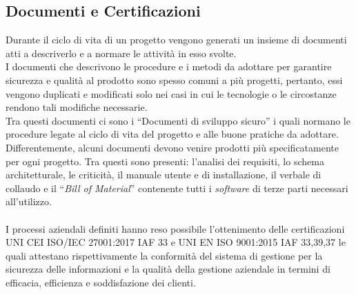 \subsection{Documenti e Certificazioni}
Durante il ciclo di vita di un progetto vengono generati un insieme di documenti atti a descriverlo e a normare le attività in esso svolte.\\
I documenti che descrivono le procedure e i metodi da adottare per garantire sicurezza e qualità al prodotto sono spesso comuni a più progetti, pertanto, essi vengono duplicati e modificati solo nei casi in cui le tecnologie o le circostanze rendono tali modifiche necessarie.\\
Tra questi documenti ci sono i “Documenti di sviluppo sicuro” i quali normano le procedure legate al ciclo di vita del progetto e alle buone pratiche da adottare.\\ 
Differentemente, alcuni documenti devono venire prodotti più specificatamente per ogni progetto. Tra questi sono presenti: l'analisi dei requisiti, lo schema architetturale, le criticità, il manuale utente e di installazione, il verbale di collaudo e il “\emph{Bill of Material}” contenente tutti i \emph{software} di terze parti necessari all'utilizzo.\\\\
I processi aziendali definiti hanno reso possibile l'ottenimento delle certificazioni UNI CEI ISO/IEC 27001:2017 IAF 33 e UNI EN ISO 9001:2015 IAF 33,39,37 le quali attestano rispettivamente la conformità del sistema di gestione per la sicurezza delle informazioni e la qualità della gestione aziendale in termini di efficacia, efficienza e soddisfazione dei clienti.\\\\


